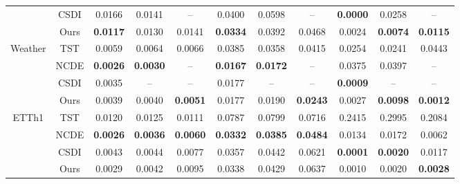 \documentclass{article}
\theoremstyle{plain}
\theoremstyle{definition}
\theoremstyle{remark}
\begin{document}
\begin{table}[!t]
{\begin{tabular}{cc|ccc|ccc|ccc}
 & CSDI & 0.0166 & 0.0141 & -- & 0.0400 & 0.0598 & -- & \textbf{0.0000} & 0.0258 & -- \\
 & Ours & \textbf{0.0117} & 0.0130 & 0.0141 & \textbf{0.0334} & 0.0392 & 0.0468 & 0.0024 & \textbf{0.0074} & \textbf{0.0115} \\
\midrule
\multirow{4}{*}{Weather} & TST & 0.0059 & 0.0064 & 0.0066 & 0.0385 & 0.0358 & 0.0415 & 0.0254 & 0.0241 & 0.0443 \\
 & NCDE & \textbf{0.0026} & \textbf{0.0030} & -- & \textbf{0.0167} & \textbf{0.0172} & -- & 0.0375 & 0.0397 & -- \\
 & CSDI & 0.0035 & -- & -- & 0.0177 & -- & -- & \textbf{0.0009} & -- & -- \\
 & Ours & 0.0039 & 0.0040 & \textbf{0.0051} & 0.0177 & 0.0190 & \textbf{0.0243} & 0.0027 & \textbf{0.0098} & \textbf{0.0012} \\
\midrule
\multirow{4}{*}{ETTh1} & TST & 0.0120 & 0.0125 & 0.0111 & 0.0787 & 0.0799 & 0.0716 & 0.2415 & 0.2995 & 0.2084 \\
 & NCDE & \textbf{0.0026} & \textbf{0.0036} & \textbf{0.0060} & \textbf{0.0332} & \textbf{0.0385} & \textbf{0.0484} & 0.0134 & 0.0172 & 0.0062 \\
 & CSDI & 0.0043 & 0.0044 & 0.0077 & 0.0357 & 0.0442 & 0.0621 & \textbf{0.0001} & \textbf{0.0020} & 0.0117 \\
 & Ours & 0.0029 & 0.0042 & 0.0095 & 0.0338 & 0.0429 & 0.0637 & 0.0010 & 0.0020 & \textbf{0.0028} \\
\bottomrule
\end{tabular}
}
\end{table}
\end{document}

